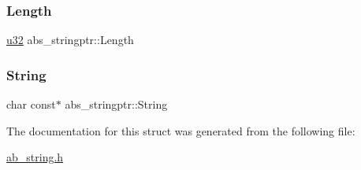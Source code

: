 \subsubsection{\texorpdfstring{Length}{Length}}
{\footnotesize\ttfamily \hyperlink{ab__common_8h_afaa62991928fb9fb18ff0db62a040aba}{u32} abs\+\_\+stringptr\+::\+Length}

\mbox{\label{structabs__stringptr_ac7296c8ae75a6cf987961712b55acaa5}} 
\subsubsection{\texorpdfstring{String}{String}}
{\footnotesize\ttfamily char const$\ast$ abs\+\_\+stringptr\+::\+String}



The documentation for this struct was generated from the following file\+:\begin{DoxyCompactItemize}
\item 
\hyperlink{ab__string_8h}{ab\+\_\+string.\+h}\end{DoxyCompactItemize}
